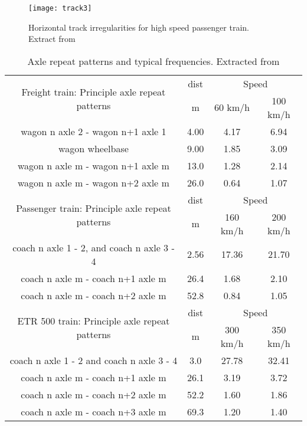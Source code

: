 \begin{appendices}
\begin{figure}[h]
    \centering
    \texttt{[image: track3]}
    \caption{Horizontal track irregularities for high speed passenger train. Extract from \citet[Figure 2.1]{d181}}
    \label{fig:track3}
\end{figure}

\begin{table}[h]
    \centering
    \begin{tabular}{c|c|c|c}
    \hline
    \multirow{2}{*}{Freight train: Principle axle repeat patterns} & dist & \multicolumn{2}{c}{Speed} \\
    & m & 60 km/h & 100 km/h \\
    \hline
    wagon n axle 2 - wagon n+1 axle 1 & 4.00 & 4.17 & 6.94 \\
    wagon wheelbase & 9.00 & 1.85 & 3.09 \\
    wagon n axle m - wagon n+1 axle m & 13.0 & 1.28 & 2.14 \\
    wagon n axle m - wagon n+2 axle m & 26.0 & 0.64 & 1.07 \\
    \hline
    \multirow{2}{*}{Passenger train: Principle axle repeat patterns} & dist & \multicolumn{2}{c}{Speed} \\
    & m & 160 km/h & 200 km/h \\
    \hline
    coach n axle 1 - 2, and coach n axle 3 - 4 & 2.56 & 17.36 & 21.70 \\
    coach n axle m - coach n+1 axle m & 26.4 & 1.68 & 2.10 \\
    coach n axle m - coach n+2 axle m & 52.8 & 0.84 & 1.05 \\
    \hline
    \multirow{2}{*}{ETR 500 train: Principle axle repeat patterns} & dist & \multicolumn{2}{c}{Speed} \\
    & m & 300 km/h & 350 km/h \\
    \hline
    coach n axle 1 - 2 and coach n axle 3 - 4 & 3.0 & 27.78 & 32.41 \\
    coach n axle m - coach n+1 axle m & 26.1 & 3.19 & 3.72 \\
    coach n axle m - coach n+2 axle m & 52.2 & 1.60 & 1.86 \\
    coach n axle m - coach n+3 axle m & 69.3 & 1.20 & 1.40 \\
    \hline
    \end{tabular}
    \caption{Axle repeat patterns and typical frequencies. Extracted from \citet[Appendix C]{d181dt329}}
    \label{tab:329axlerepeat}
\end{table}


\end{appendices}
